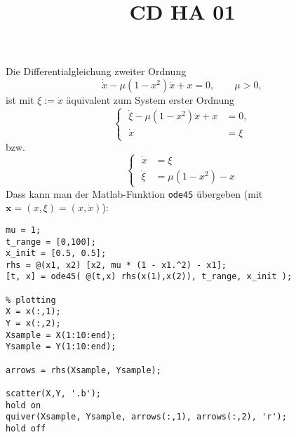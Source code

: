 \documentclass[a4paper]{article}
\title{CD HA 01}
\begin{document}
\section{}
Die Differentialgleichung zweiter Ordnung
\begin{equation}
    \label{eqn:diff1}
    \dot{\dot x} - μ ( 1 - x^2) \dot x + x = 0, \qquad μ>0,
\end{equation}
ist mit $ξ := \dot x$ äquivalent zum System erster Ordnung
\begin{equation*}
    \left \{ \; \begin{aligned}
    \dot ξ - μ(1-x^2) \dot x + x &= 0,\\
    \dot x &= ξ 
    \end{aligned}\right.
\end{equation*}
bzw.
\begin{equation}
    \label{eqn:diff2}
    \left\{ \; \begin{aligned}
    \dot x &= ξ\\
    \dot ξ &= μ(1-x^2) - x
    \end{aligned} \right.
\end{equation}
Dass kann man der Matlab-Funktion \verb!ode45! übergeben (mit $\mathbf x = (x, ξ) = (x,\dot x)$):
\begin{verbatim}
mu = 1;
t_range = [0,100];
x_init = [0.5, 0.5];
rhs = @(x1, x2) [x2, mu * (1 - x1.^2) - x1];
[t, x] = ode45( @(t,x) rhs(x(1),x(2)), t_range, x_init );

% plotting
X = x(:,1);
Y = x(:,2);
Xsample = X(1:10:end);
Ysample = Y(1:10:end);

arrows = rhs(Xsample, Ysample);

scatter(X,Y, '.b');
hold on
quiver(Xsample, Ysample, arrows(:,1), arrows(:,2), 'r');
hold off
\end{verbatim}

\setcounter{section}{2}
\section{}
\end{document}
